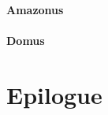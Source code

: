 \paragraph{Amazonus}
\cursive{
  \itshape
  \\
  \\
  \\
  \\

  \\
  \\
  \\
  \\

  \\
  \\
  \\

  \\
  \\
  \\
}
\paragraph{Domus}
\cursive{
  \itshape
  \\
  \\
  \\
  \\

  \\
  \\
  \\
  \\

  \\
  \\
  \\

  \\
  \\
  \\
}

\section{Epilogue}


